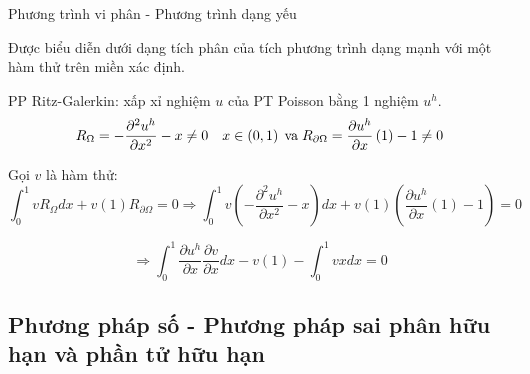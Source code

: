 \documentclass[aspectratio=169, t]{beamer} %
\begin{document}
\begin{frame}{Phương trình vi phân - Phương trình dạng yếu}

Được biểu diễn dưới dạng tích phân của tích phương trình dạng mạnh với một hàm thử trên miền xác định. 

PP Ritz-Galerkin: xấp xỉ nghiệm $u$ của PT Poisson bằng 1 nghiệm $u^h$.
\begin{equation}
    R_{\Omega} = -\frac{\partial^2 u^h}{\partial x^2} - x \neq 0 \quad x \in \left(0, 1\right) \; \hbox{va} \;
    R_{\partial\Omega} = \frac{\partial u^h}{\partial x} \left(1\right) - 1 \neq 0
\end{equation}

Gọi $v$ là hàm thử:
\begin{equation}\label{eq_Ritz}
    \int_0^1 v R_{\Omega}dx + v(1)R_{\partial\Omega} = 0 
    \Rightarrow \int_0^1 v \left(-\frac{\partial^2 u^h}{\partial x^2} - x\right)dx + v(1)\left(\frac{\partial u^h}{\partial x} \left(1\right) - 1\right) =0
\end{equation}

\begin{equation}\label{eq_weakform}
    \Rightarrow \int_0^1 \frac{\partial u^h}{\partial x} \frac{\partial v}{\partial x}dx - v(1) - \int_0^1 v x dx =0
\end{equation}

\end{frame}


\subsection{Phương pháp số - Phương pháp sai phân hữu hạn và phần tử hữu hạn}
\end{document}
